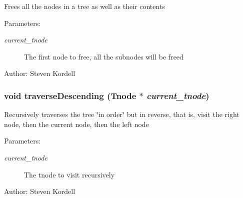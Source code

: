 Frees all the nodes in a tree as well as their contents \begin{Desc}
\item[Parameters:]
\begin{description}
\item[{\em current\_\-tnode}]The first node to free, all the subnodes will be freed \end{description}
\end{Desc}
\begin{Desc}
\item[Author:]Steven Kordell \end{Desc}
\subsubsection{\setlength{\rightskip}{0pt plus 5cm}void traverse\-Descending (\bf{Tnode} $\ast$ {\em current\_\-tnode})}\label{tree_8c_344da03e1ee05b6b54d304448974ab41}


Recursively traverses the tree \char`\"{}in order\char`\"{} but in reverse, that is, visit the right node, then the current node, then the left node \begin{Desc}
\item[Parameters:]
\begin{description}
\item[{\em current\_\-tnode}]The tnode to visit recursively \end{description}
\end{Desc}
\begin{Desc}
\item[Author:]Steven Kordell \end{Desc}

